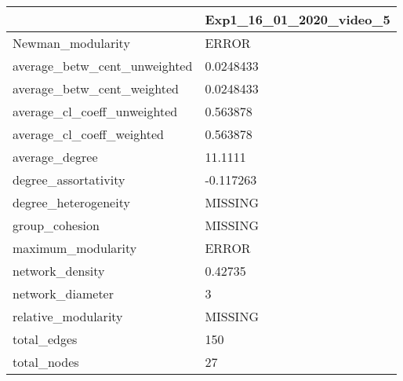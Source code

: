 \begin{tabular}{ll}
\toprule
{} & Exp1\_16\_01\_2020\_video\_5 \\
\midrule
Newman\_modularity            &                   ERROR \\
average\_betw\_cent\_unweighted &               0.0248433 \\
average\_betw\_cent\_weighted   &               0.0248433 \\
average\_cl\_coeff\_unweighted  &                0.563878 \\
average\_cl\_coeff\_weighted    &                0.563878 \\
average\_degree               &                 11.1111 \\
degree\_assortativity         &               -0.117263 \\
degree\_heterogeneity         &                 MISSING \\
group\_cohesion               &                 MISSING \\
maximum\_modularity           &                   ERROR \\
network\_density              &                 0.42735 \\
network\_diameter             &                       3 \\
relative\_modularity          &                 MISSING \\
total\_edges                  &                     150 \\
total\_nodes                  &                      27 \\
\bottomrule
\end{tabular}
